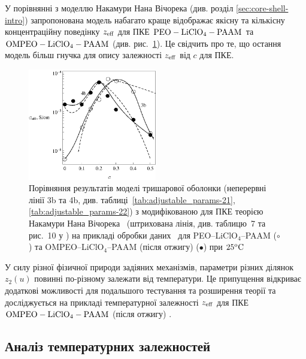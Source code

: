 \documentclass[14pt,twoside]{vakthesis}
\begin{document}
У порівнянні з моделлю Накамури Нана Вічорека (див. розділ \ref{sec:core-shell-intro}) запропонована модель набагато краще відображає якісну та кількісну концентраційну поведінку ${z}_{\rm eff}$ для ПКЕ $\rm PEO-LiClO_4-PAAM$ та $\rm OMPEO-LiClO_4-PAAM$ (див. рис.~\ref{fig:comparison_polymer}). Це свідчить про те, що остання модель більш гнучка для опису залежності ${z}_{\rm eff}$  від $c$ для ПКЕ.

\begin{figure}[tb]
	\centering
	\includegraphics[width=0.5\textwidth]{Fig5_Comparison.eps}
	\caption{\label{fig:comparison_polymer} Порівняння результатів
		моделі тришарової оболонки (неперервні лінії 3b та 4b, див.
		таблиці~\ref{tab:adjustable_params-21}, \ref{tab:adjustable_params-22}) з модифікованою для 
		ПКЕ теорією Накамури Нана Вічорека~\cite{Wiec1994} (штрихована лінія, див. 
		таблицю~7 та рис.~10 у \cite{Wiec1994}) на прикладі обробки
		даних~\cite{Wiec1994} для PEO--LiClO$_4$--PAAM ($\circ$) та
		OMPEO--LiClO$_4$--PAAM (після отжигу) ($\bullet$) при $25 {\rm ^oC}$ 
	}
\end{figure}

У силу різної фізичної природи задіяних механізмів, параметри різних ділянок ${z}_2(u)$ повинні по-різному залежати від температури. Це припущення відкриває додаткові можливості для подальшого тестування та розширення теорії та досліджується на прикладі температурної залежності ${z}_{\rm eff}$ для ПКЕ $\rm OMPEO-LiClO_4-PAAM$ (після отжигу) \cite{Wiec1994}. 


\subsection{Аналіз температурних залежностей}%
\end{document}
